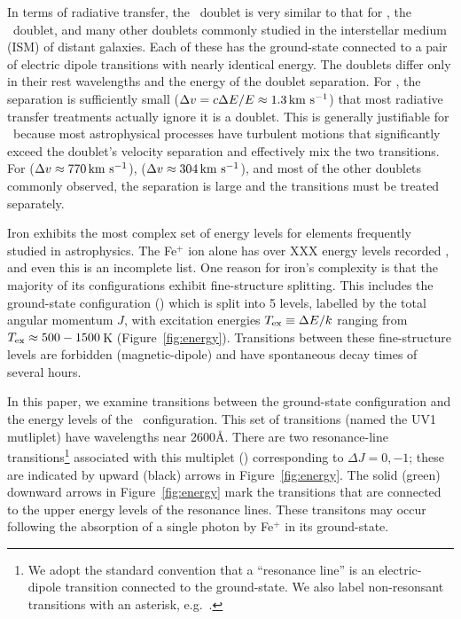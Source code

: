 \documentclass[12pt,preprint]{aastex}
\begin{document}
In terms of radiative transfer, the 
\mgiid\ doublet is very similar to that for 
\lya, the \naid\ doublet, and many other doublets commonly
studied in the interstellar medium (ISM) of distant galaxies.  
Each of these has the ground-state connected to a pair of electric
dipole transitions with nearly identical energy.
The doublets differ only in 
their rest wavelengths and the energy of the doublet separation. 
For  \lya, the
separation is sufficiently small ($\Delta v = c \Delta E / E \approx
1.3 \, {\rm km~s^{-1}}$) that most radiative transfer treatments actually ignore it
is a doublet.
This is generally justifiable for \lya\ because 
most astrophysical processes have turbulent motions that
significantly exceed the doublet's velocity separation and effectively mix the
two transitions.  For  ($\Delta v \approx 770 \, {\rm km~s^{-1}}$),  
 ($\Delta v \approx 304 \, {\rm km~s^{-1}}$), and most of the other doublets
commonly observed, the separation is large and the transitions
must be treated separately.  

Iron exhibits the most complex set of energy levels for elements
frequently studied in astrophysics.  The Fe$^+$ ion alone has over XXX
energy levels recorded \citep{iron}, and even this is an
incomplete list.  
One reason for iron's complexity is
that the majority of its configurations exhibit fine-structure splitting.
This includes the ground-state configuration (\aconfig) which is split
into 5 levels, 
labelled by the total angular momentum $J$, 
with excitation energies $T_{\rm ex} \equiv \Delta E / k$ ranging from
$T_{\rm ex} \approx 500-1500$\,K (Figure~\ref{fig:energy}).  
Transitions between these fine-structure levels are 
forbidden (magnetic-dipole) and have spontaneous decay times of several hours.  

In this paper, we examine transitions between the ground-state
configuration and the energy levels of the \zconfig\
configuration.  This set of transitions (named the
UV1 mutliplet) have wavelengths near 2600\AA.
There are two resonance-line transitions\footnote{We adopt the
  standard convention that a ``resonance line'' is an electric-dipole
  transition connected to the ground-state.  We also label
  non-resonsant transitions with an asterisk, e.g.\ \feiic.} 
associated with this multiplet (\feiid)
corresponding to $\Delta J = 0, -1$; these are indicated by upward (black) arrows
in Figure~\ref{fig:energy}. The solid (green) downward
arrows in Figure~\ref{fig:energy} mark the transitions that are
connected to
the upper energy levels of the resonance lines.  These transitons may
occur following the absorption of a single photon by Fe$^+$ in its
ground-state.  
\end{document}
